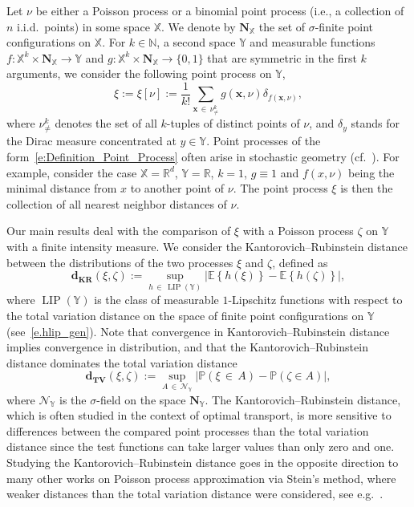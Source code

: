 \documentclass[10pt]{amsart}
\theoremstyle{definition}\newtheorem{defi}[theo]{Definition}\newtheorem{rema}[theo]{Remark}\newtheorem{exam}[theo]{Example}\newtheorem{exem}[theo]{Example}\newtheorem{nota}[theo]{Notation}
\DeclareMathOperator{\LIP}{LIP}
\newcommand*\bN{\mathbf{N}}
\newcommand{\bx}{\mathbf{x}}
\newcommand*\dkr{\mathbf{d_{KR}}}
\newcommand*\dTV{\mathbf{d_{TV}}}
\newcommand*\N{\mathbb{N}}
\newcommand*\R{\mathbb{R}}
\renewcommand*\P{\mathbb{P}}
\newcommand*\X{\mathbb{X}}
\newcommand*\Y{\mathbb{Y}}
\newcommand{\E}{\mathbb{E}}
\newcommand*\cN{\mathcal{N}}
\newcommand{\mean}[1] {\E\left\{{#1}\right\}}
\newcommand{\prob}[1]{\P\left(#1\right)}
\begin{document}
Let $\nu$ be either a Poisson process or a binomial point process (i.e., a collection of $n$ i.i.d.\ points) in some space $\X$. We denote by $\bN_{\X}$ the set of $\sigma$-finite point configurations on $\X$. For $k\in\N$, a second space $\Y$ and measurable functions $f: \X^k\times \bN_{\X}\to \Y$ and $g: \X^k\times \bN_{\X}\to \{0,1\}$ that are symmetric in the first $k$ arguments, we consider the following point process on $\Y$,
\begin{equation}\label{e:Definition_Point_Process}
\xi {:=} \xi[\nu] {:=} \frac{1}{k!}\sum_{\bx\,\in\,\nu^k_{\neq}} g(\bx,\nu) \delta_{f(\bx,\nu)},
\end{equation}
where $\nu^k_{\neq}$ denotes the set of all $k$-tuples of distinct points of $\nu$, and $\delta_y$ stands for the Dirac measure concentrated at $y\in\Y$. Point processes of the form~\eqref{e:Definition_Point_Process} often arise in stochastic geometry (cf.~\cite{Otto2020,PianoforteSchulte2021}). For example, consider the case $\X=\R^d$, $\Y=\R$, $k=1$, $g \equiv 1$ and $f(x,\nu)$ being the minimal distance from $x$ to another point of $\nu$. The point process $\xi$ is then the collection of all nearest neighbor distances of $\nu$.

Our main results deal with the comparison of $\xi$ with a Poisson process $\zeta$ on $\Y$ with a finite intensity measure. We consider the Kantorovich--Rubinstein distance between the distributions of the two processes $\xi$ and $\zeta$, defined as
\begin{equation}\label{d:dkr}
\dkr(\xi,\zeta) {:=} \sup_{h\,\in\,\LIP(\Y)} \left|\mean{h(\xi)} - \mean{h(\zeta)}\right|,
\end{equation}
where $\LIP(\Y)$ is the class of measurable $1$-Lipschitz functions with respect to the total variation distance on the space of finite point configurations on $\Y$ (see~\eqref{e.hlip_gen}). Note that convergence in Kantorovich--Rubinstein distance implies convergence in distribution, and that the Kantorovich--Rubinstein distance dominates the total variation distance
\begin{equation}\label{d:dtv}
\dTV(\xi,\zeta) {:=} \sup_{A\,\in\,\cN_{\Y}} \left|\prob{\xi\,\in\,A} - \prob{\zeta\in A}\right|,
\end{equation}
where $\cN_{\Y}$ is the $\sigma$-field on the space $\bN_{\Y}$. The Kantorovich--Rubinstein distance, which is often studied in the context of optimal transport, is more sensitive to differences between the compared point processes than the total variation distance since the test functions can take larger values than only zero and one. Studying the Kantorovich--Rubinstein distance goes in the opposite direction to many other works on Poisson process approximation via Stein's method, where weaker distances than the total variation distance were considered, see e.g.~\cite{Barbour1992, Barbour1992book, Chen2004, Schuhmacher2005, Schuhmacher2009, Xia2005}.
\end{document}
